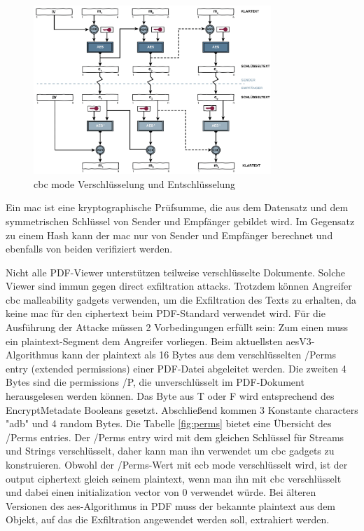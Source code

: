 \begin{figure}[!htb]
	\centering
	\includegraphics[width=0.8\textwidth]{"images/cbc.png"}
	\caption{\gls{cbc} mode Verschlüsselung und Entschlüsselung \cite{cbc}}
	\label{fig:cbc}
\end{figure}

Ein \gls{mac} ist eine kryptographische Prüfsumme, die aus dem Datensatz und dem symmetrischen Schlüssel von Sender und Empfänger gebildet wird. Im Gegensatz zu einem Hash kann der \gls{mac} nur von Sender und Empfänger berechnet und ebenfalls von beiden verifiziert werden. \cite{crypto-web}
\par
Nicht alle PDF-Viewer unterstützen teilweise verschlüsselte Dokumente. Solche Viewer sind immun gegen direct exfiltration attacks. Trotzdem können Angreifer \gls{cbc} malleability gadgets verwenden, um die Exfiltration des Texts zu erhalten, da keine \gls{mac} für den ciphertext beim PDF-Standard verwendet wird. Für die Ausführung der Attacke müssen 2 Vorbedingungen erfüllt sein: Zum einen muss ein plaintext-Segment dem Angreifer vorliegen. Beim aktuellsten \gls{aes}V3-Algorithmus kann der plaintext als 16 Bytes aus dem verschlüsselten /Perms entry (extended permissions) einer PDF-Datei abgeleitet werden. Die zweiten 4 Bytes sind die permissions /P, die unverschlüsselt im PDF-Dokument herausgelesen werden können. Das Byte aus T oder F wird entsprechend des EncryptMetadate Booleans gesetzt. Abschließend kommen 3 Konstante characters "adb" und 4 random Bytes. Die Tabelle \ref{fig:perms} bietet eine Übersicht des /Perms entries. Der /Perms entry wird mit dem gleichen Schlüssel für Streams und Strings verschlüsselt, daher kann man ihn verwendet um \gls{cbc} gadgets zu konstruieren. Obwohl der /Perms-Wert mit \gls{ecb} mode verschlüsselt wird, ist der output ciphertext gleich seinem plaintext, wenn man ihn mit \gls{cbc} verschlüsselt und dabei einen initialization vector von 0 verwendet würde. Bei älteren Versionen des \gls{aes}-Algorithmus in PDF muss der bekannte plaintext aus dem Objekt, auf das die Exfiltration angewendet werden soll, extrahiert werden. \cite{ccc-break-pdf, pdfex}
\par

